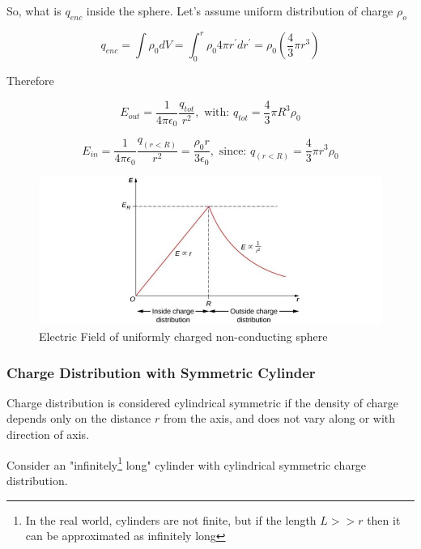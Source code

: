 \documentclass[14pt]{memoir}
\begin{document}
So, what is $q_{enc}$ inside the sphere. Let's assume uniform distribution of charge $\rho_o$

\begin{equation}
q_{enc} = \int \rho_0 dV = \int_{0}^{r} \rho_0 4 \pi r^{\prime} dr^{\prime} = \rho_0 (\frac{4}{3} \pi r^3)
\end{equation}

Therefore

\begin{equation}
E_{out} = \frac{1}{4 \pi \epsilon_0}\frac{q_{tot}}{r^2}, \text{ with: } q_{tot} = \frac{4}{3} \pi R^3 \rho_0
\end{equation}

\begin{equation}
E_{in} = \frac{1}{4 \pi \epsilon_0}\frac{q_{(r<R)}}{r^2} = \frac{\rho_0 r}{3 \epsilon_0}, \text{  since: } q_{(r<R)} = \frac{4}{3} \pi r^3 \rho_0
\end{equation}

\begin{figure}[H]
\begin{center}
\includegraphics[scale=0.40]{fig/fig_06_24.jpg}
\caption{Electric Field of uniformly charged non-conducting sphere}
\label{fig:06_24}
\end{center}
\end{figure}

\subsubsection{Charge Distribution with Symmetric Cylinder}

Charge distribution is considered cylindrical symmetric if the density of charge depends only on the distance $r$ from the axis, and does not vary along or with direction of axis.

Consider an "infinitely\footnote{In the real world, cylinders are not finite, but if the length $L >> r$ then it can be approximated as infinitely long} long" cylinder with cylindrical symmetric charge distribution.
\end{document}
